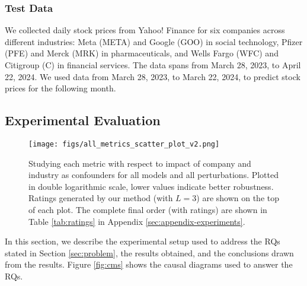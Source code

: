 \subsubsection{Test Data}

We collected daily stock prices from Yahoo! Finance for six companies across different industries: Meta (META) and Google (GOO) in social technology, Pfizer (PFE) and Merck (MRK) in pharmaceuticals, and Wells Fargo (WFC) and Citigroup (C) in financial services. The data spans from March 28, 2023, to April 22, 2024. We used data from March 28, 2023, to March 22, 2024, to predict stock prices for the following month. 

\subsection{Experimental Evaluation}
\label{sec:expts} 

\begin{figure}[!h]
\centering
\texttt{[image: figs/all\_metrics\_scatter\_plot\_v2.png]}
\caption{Studying each metric with respect to impact of company and industry as confounders for all models and all perturbations. Plotted in double logarithmic scale, lower values indicate better robustness. Ratings generated by our method (with $L=3$) are shown on the top of each plot. The complete final order (with ratings) are shown in Table \ref{tab:ratings} in Appendix \ref{sec:appendix-experiments}.
}
\vspace{-2em}
\label{fig:confs}
\end{figure}
In this section, we describe the experimental setup used to address the RQs stated in Section \ref{sec:problem}, the results obtained, and the conclusions drawn from the results. Figure \ref{fig:cms} shows the causal diagrams used to answer the RQs. 



